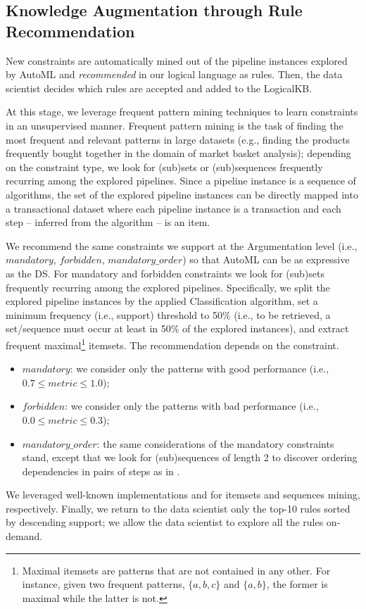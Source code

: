 \subsection{Knowledge Augmentation through Rule Recommendation}

New constraints are automatically mined out of the pipeline instances explored by AutoML and \emph{recommended} in our logical language as rules.
Then, the data scientist decides which rules are accepted and added to the LogicalKB.


At this stage, we leverage frequent pattern mining techniques to learn constraints in an unsupervised manner.
Frequent pattern mining is the task of finding the most frequent and relevant patterns in large datasets (e.g., finding the products frequently bought together in the domain of market basket analysis); depending on the constraint type, we look for (sub)sets \cite{srikant1995mining} or (sub)sequences \cite{srikant1996mining} frequently recurring among the explored pipelines.
Since a pipeline instance is a sequence of algorithms, the set of the explored pipeline instances can be directly mapped into a transactional dataset \cite{srikant1995mining} where each pipeline instance is a transaction and each step -- inferred from the algorithm -- is an item.

We recommend the same constraints we support at the Argumentation level (i.e., $mandatory$, $forbidden$, $mandatory\_order$) so that AutoML can be as expressive as the DS.
For mandatory and forbidden constraints we look for (sub)sets \cite{srikant1995mining} frequently recurring among the explored pipelines.
Specifically, we split the explored pipeline instances by the applied Classification algorithm, set a minimum frequency (i.e., support) threshold to 50\% (i.e., to be retrieved, a set/sequence must occur at least in 50\% of the explored instances), and extract frequent maximal\footnote{Maximal itemsets are patterns that are not contained in any other.
For instance, given two frequent patterns, $\{a, b, c\}$ and $\{a, b\}$, the former is maximal while the latter is not.
}
itemsets.
The recommendation depends on the constraint.
\begin{itemize}
    \item $mandatory$: we consider only the patterns with good performance (i.e., $0.7 \leq metric \leq 1.0$); 
    \item $forbidden$: we consider only the patterns with bad performance (i.e., $0.0 \leq metric \leq 0.3$);
    \item $mandatory\_order$: the same considerations of the mandatory constraints stand, except that we look for (sub)sequences \cite{srikant1996mining} of length 2 to discover ordering dependencies in pairs of steps as in \cite{giovanelli2021data}.   
\end{itemize}
We leveraged well-known implementations \cite{raschkas_2018_mlxtend} and \cite{seq2pat2022} for itemsets and sequences mining, respectively.
Finally, we return to the data scientist only the top-10 rules sorted by descending support; we allow the data scientist to explore all the rules on-demand.

